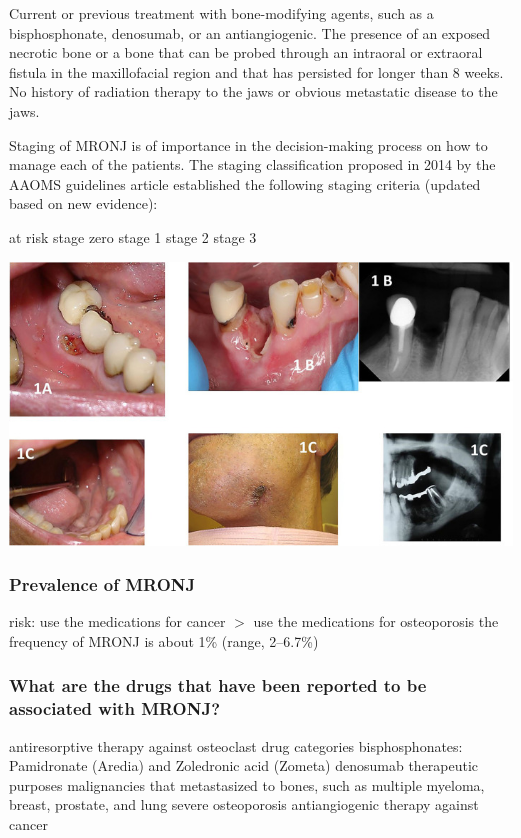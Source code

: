 \documentclass[
paper=landscape,
paper=160mm:90mm, %
fontsize=11pt, %
pagesize, %
parskip=half-, %
]{scrartcl} %
\theoremstyle{mythmstyle} %
\begin{document}
\autocite{Migliorati2022}

\begin{outline}
\1 Current or previous treatment with bone-modifying agents, such as a bisphosphonate, denosumab, or an antiangiogenic.
\1 The presence of an exposed necrotic bone or a bone that can be probed through an intraoral or extraoral fistula in the maxillofacial region and that has persisted for longer than 8 weeks.
\1 No history of radiation therapy to the jaws or obvious metastatic disease to the jaws.

\clearpage

\1 Staging of MRONJ is of importance in the decision-making process on how to manage each of the patients. The staging classification proposed in 2014 by the AAOMS guidelines article established the following staging criteria (updated based on new evidence):

    \2 at risk
    \2 stage zero
    \2 stage 1
    \2 stage 2
    \2 stage 3
\end{outline}

\includegraphics[width=0.8\linewidth]{froh-03-866871-g0001.jpg}
\clearpage

\subsubsection{Prevalence of MRONJ}
\begin{outline}
    \1 risk: use the medications for cancer $>$ use the medications for osteoporosis
    \1 the frequency of MRONJ is about 1\% (range, 2–6.7\%) 
\end{outline}

\clearpage
\subsubsection{What are the drugs that have been reported to be associated with MRONJ?}

\begin{outline}
    \1 antiresorptive therapy against osteoclast
    \2 drug categories
        \3 bisphosphonates: Pamidronate (Aredia) and Zoledronic acid (Zometa)
        \3 denosumab
    \2 therapeutic purposes
        \3 malignancies that metastasized to bones, such as multiple myeloma, breast, prostate, and lung
        \3 severe osteoporosis
    \1 antiangiogenic therapy against cancer
\end{outline}
\end{document}
